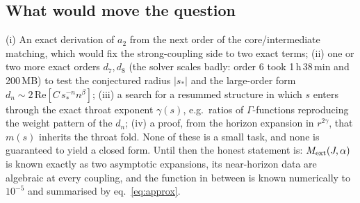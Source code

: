 \subsection*{What would move the question}

(i) An exact derivation of $a_2$ from the next order of the core/intermediate matching, which
would fix the strong-coupling side to two exact terms; (ii) one or two more exact orders
$d_7,d_8$ (the solver scales badly: order 6 took 1\,h\,38\,min and 200\,MB) to test the
conjectured radius $|s_*|$ and the large-order form $d_n\sim2\,\mathrm{Re}[C\,s_*^{-n}n^{\beta}]$;
(iii) a search for a resummed structure in which $s$ enters through the exact throat exponent
$\gamma(s)$, e.g.\ ratios of $\Gamma$-functions reproducing the weight pattern of the $d_n$;
(iv) a proof, from the horizon expansion in $r^{2\gamma}$, that $m(s)$ inherits the throat fold.
None of these is a small task, and none is guaranteed to yield a closed form. Until then the
honest statement is: $M_{\rm ext}(J,\alpha)$ is known exactly as two asymptotic expansions, its
near-horizon data are algebraic at every coupling, and the function in between is known
numerically to $10^{-5}$ and summarised by eq.~\eqref{eq:approx}.
